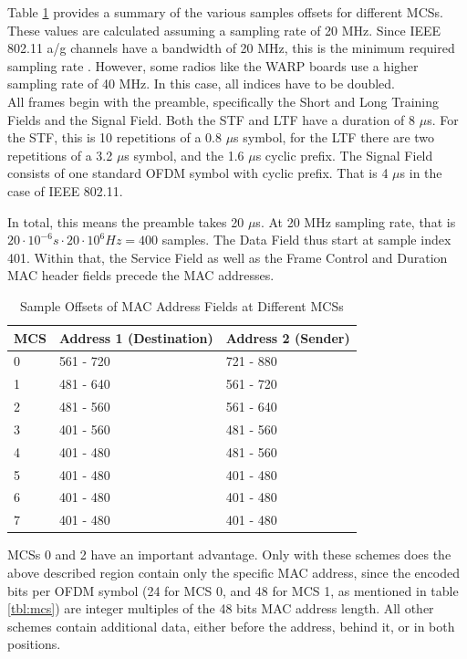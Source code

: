 Table \ref{tbl:sample-offsets} provides a summary of the various samples offsets for different \glspl{MCS}. These values are calculated assuming a sampling rate of 20 MHz. Since IEEE 802.11 a/g channels have a bandwidth of 20 MHz, this is the minimum required sampling rate \cite{ieee2012}. However, some radios like the \gls{WARP} boards use a higher sampling rate of 40 MHz. In this case, all indices have to be doubled.\\

All frames begin with the preamble, specifically the Short and Long Training Fields and the Signal Field. Both the \gls{STF} and \gls{LTF} have a duration of 8 $\mu$s. For the \gls{STF}, this is 10 repetitions of a 0.8 $\mu$s symbol, for the \gls{LTF} there are two repetitions of a 3.2 $\mu$s symbol, and the 1.6 $\mu$s cyclic prefix. The Signal Field consists of one standard \gls{OFDM} symbol with cyclic prefix. That is 4 $\mu$s in the case of IEEE 802.11.

In total, this means the preamble takes 20 $\mu$s. At 20 MHz sampling rate, that is $ 20 \cdot 10^{-6} s \cdot 20 \cdot 10^6 Hz= 400 $ samples. The Data Field thus start at sample index 401. Within that, the Service Field as well as the Frame Control and Duration \gls{MAC} header fields precede the \gls{MAC} addresses.\\

\begin{table}[ht]
	\centering
	\begin{tabular}{|p{2.5cm}|p{4.5cm}|p{4.5cm}|}
		\hline
		\textbf{MCS} & \textbf{Address 1 (Destination)} & \textbf{Address 2 (Sender)} \\ \hline
		0 & 561 - 720 & 721 - 880 \\ \hline
		1 & 481 - 640 & 561 - 720 \\ \hline
		2 & 481 - 560 & 561 - 640 \\ \hline
		3 & 401 - 560 & 481 - 560 \\ \hline
		4 & 401 - 480 & 481 - 560 \\ \hline
		5 & 401 - 480 & 401 - 480 \\ \hline
		6 & 401 - 480 & 401 - 480 \\ \hline
		7 & 401 - 480 & 401 - 480 \\ \hline
	\end{tabular}
	\caption{Sample Offsets of MAC Address Fields at Different MCSs}
	\label{tbl:sample-offsets}
\end{table}

\glspl{MCS} 0 and 2 have an important advantage. Only with these schemes does the above described region contain only the specific \gls{MAC} address, since the encoded bits per \gls{OFDM} symbol (24 for \gls{MCS} 0, and 48 for \gls{MCS} 1, as mentioned in table \ref{tbl:mcs}) are integer multiples of the 48 bits \gls{MAC} address length. All other schemes contain additional data, either before the address, behind it, or in both positions.


